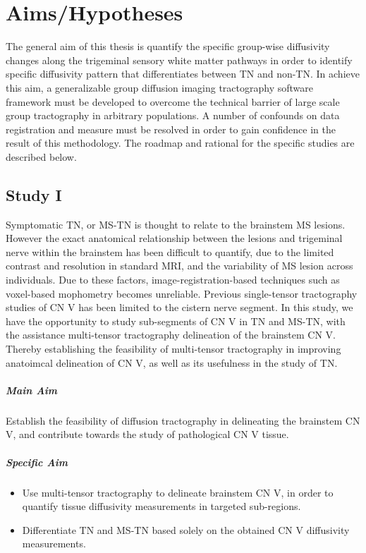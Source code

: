\chapter{Aims/Hypotheses}

The general aim of this thesis is quantify the specific group-wise diffusivity changes along the trigeminal sensory white matter pathways in order to identify specific diffusivity pattern that differentiates between TN and non-TN. In achieve this aim, a generalizable group diffusion imaging tractography software framework must be developed to overcome the technical barrier of large scale group tractography in arbitrary populations. A number of confounds on data registration and measure must be resolved in order to gain confidence in the result of this methodology. The roadmap and rational for the specific studies are described below.

\section{Study I}
Symptomatic TN, or MS-TN is thought to relate to the brainstem MS lesions. However the exact anatomical relationship between the lesions and trigeminal nerve within the brainstem has been difficult to quantify, due to the limited contrast and resolution in standard MRI, and the variability of MS lesion across individuals. Due to these factors, image-registration-based techniques such as voxel-based mophometry becomes unreliable. Previous single-tensor tractography studies of CN V has been limited to the cistern nerve segment. In this study, we have the opportunity to study sub-segments of CN V in TN and MS-TN, with the assistance multi-tensor tractography delineation of the brainstem CN V. Thereby establishing the feasibility of multi-tensor tractography in improving anatoimcal delineation of CN V, as well as its usefulness in the study of TN. 

\paragraph{Main Aim} Establish the feasibility of diffusion tractography in delineating the brainstem CN V, and contribute towards the study of pathological CN V tissue.

\paragraph{Specific Aim}
\begin{itemize}
    \item Use multi-tensor tractography to delineate brainstem CN V, in order to quantify tissue diffusivity measurements in targeted sub-regions.
    \item Differentiate TN and MS-TN based solely on the obtained CN V diffusivity measurements.
\end{itemize}
